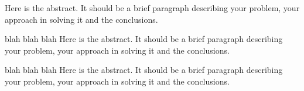 Here is the abstract. It should be a brief paragraph describing your
problem, your approach in solving it and the conclusions.

blah blah blah Here is the abstract. It should be a brief paragraph describing your
problem, your approach in solving it and the conclusions.

blah blah blah Here is the abstract. It should be a brief paragraph describing your
problem, your approach in solving it and the conclusions.



